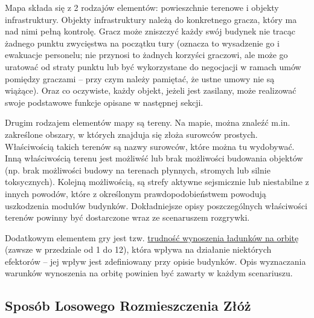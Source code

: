 \documentclass[11pt,a4paper]{article}
\begin{document}
Mapa składa się z 2 rodzajów elementów: powieszchnie terenowe i objekty infrastruktury. Objekty infrastruktury należą do konkretnego gracza, który ma nad nimi pełną kontrolę. Gracz może zniszczyć każdy swój budynek nie tracąc żadnego punktu zwycięstwa na początku tury (oznacza to wysadzenie go i ewakuacje personelu; nie przynosi to żadnych korzyści graczowi, ale może go uratować od straty punktu lub być wykorzystane do negocjacji w ramach umów pomiędzy graczami -- przy czym należy pamiętać, że ustne umowy nie są wiążące). Oraz co oczywiste, każdy objekt, jeżeli jest zasilany, może realizować swoje podstawowe funkcje opisane w następnej sekcji.

Drugim rodzajem elementów mapy są tereny. Na mapie, można znaleźć m.in. zakreślone obszary, w których znajduja się złoża surowców prostych. Właściwością takich terenów są nazwy surowców, które można tu wydobywać. Inną właściwością terenu jest możliwść lub brak możliwości budowania objektów (np. brak możliwości budowy na terenach płynnych, stromych lub silnie toksycznych). Kolejną możliwością, są strefy aktywne sejsmicznie lub niestabilne z innych powodów, które z określonym prawdopodobieństwem powodują uszkodzenia modułów budynków. Dokładniejsze opisy poszczególnych właściwości terenów powinny być dostarczone wraz ze scenaruszem rozgrywki.

Dodatkowym elementem gry jest tzw. \underline{trudność wynoszenia ładunków na orbitę} (zawsze w przedziale od 1 do 12), która wpływa na działanie niektórych efektorów -- jej wpływ jest zdefiniowany przy opisie budynków. Opis wyznaczania warunków wynoszenia na orbitę powinien być zawarty w każdym scenariuszu.

\newpage

\subsection{Sposób Losowego Rozmieszczenia Złóż}
\end{document}
